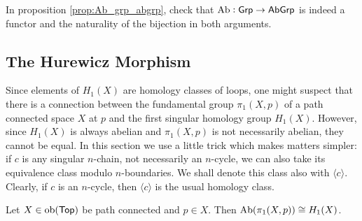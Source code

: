 \begin{exercise}
	In proposition \ref{prop:Ab_grp_abgrp}, check that $\operatorname{Ab} : \mathsf{Grp} \to \mathsf{AbGrp}$ is indeed a functor and the naturality of the bijection in both arguments. 
\end{exercise}

\subsection*{The Hurewicz Morphism}
Since elements of $H_1(X)$ are homology classes of loops, one might suspect that there is a connection between the fundamental group $\pi_1(X,p)$ of a path connected space $X$ at $p$ and the first singular homology group $H_1(X)$. However, since $H_1(X)$ is always abelian and $\pi_1(X,p)$ is not necessarily abelian, they cannot be equal. In this section we use a little trick which makes matters simpler: if $c$ is any singular $n$-chain, not necessarily an $n$-cycle, we can also take its equivalence class modulo $n$-boundaries. We shall denote this class also with $\langle c \rangle$. Clearly, if $c$ is an $n$-cycle, then $\langle c \rangle$ is the usual homology class.

\begin{theorem}
	Let $X \in \operatorname{ob}(\mathsf{Top})$ be path connected and $p \in X$. Then $\operatorname{Ab}(\pi_1(X,p)) \cong H_1(X)$.
\end{theorem}

